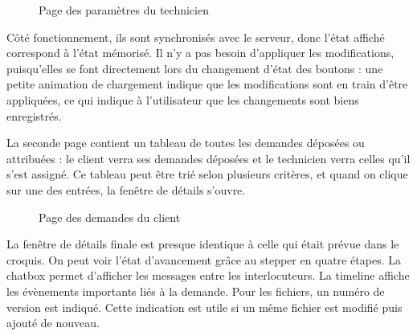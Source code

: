 \documentclass[
    iai, %
    eai, %
]{heig-tb}
\begin{document}
\begin{figure}[h!]
  \caption{Page des paramètres du technicien}
\end{figure}

Côté fonctionnement, ils sont synchronisés avec le serveur, donc l'état affiché correspond à l'état mémorisé.
Il n'y a pas besoin d'appliquer les modifications, puisqu'elles se font directement lors du changement d'état des boutons : une petite animation de chargement indique que les modifications sont en train d'être appliquées, ce qui indique à l'utilisateur que les changements sont biens enregistrés.

\newpage
La seconde page contient un tableau de toutes les demandes déposées ou attribuées : le client verra ses demandes déposées et le technicien verra celles qu'il s'est assigné.
Ce tableau peut être trié selon plusieurs critères, et quand on clique sur une des entrées, la fenêtre de détails s'ouvre.

\begin{figure}[h!]
  \caption{Page des demandes du client}
\end{figure}

La fenêtre de détails finale est presque identique à celle qui était prévue dans le croquis.
On peut voir l'état d'avancement grâce au stepper en quatre étapes.
La chatbox permet d'afficher les messages entre les interlocuteurs.
La timeline affiche les évènements importants liés à la demande.
Pour les fichiers, un numéro de version est indiqué.
Cette indication est utile si un même fichier est modifié puis ajouté de nouveau.
\end{document}
